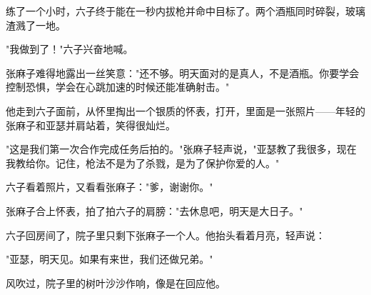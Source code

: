 练了一个小时，六子终于能在一秒内拔枪并命中目标了。两个酒瓶同时碎裂，玻璃渣溅了一地。

"我做到了！"六子兴奋地喊。

张麻子难得地露出一丝笑意："还不够。明天面对的是真人，不是酒瓶。你要学会控制恐惧，学会在心跳加速的时候还能准确射击。"

他走到六子面前，从怀里掏出一个银质的怀表，打开，里面是一张照片——年轻的张麻子和亚瑟并肩站着，笑得很灿烂。

"这是我们第一次合作完成任务后拍的。"张麻子轻声说，"亚瑟教了我很多，现在我教给你。记住，枪法不是为了杀戮，是为了保护你爱的人。"

六子看着照片，又看看张麻子："爹，谢谢你。"

张麻子合上怀表，拍了拍六子的肩膀："去休息吧，明天是大日子。"

六子回房间了，院子里只剩下张麻子一个人。他抬头看着月亮，轻声说：

"亚瑟，明天见。如果有来世，我们还做兄弟。"

风吹过，院子里的树叶沙沙作响，像是在回应他。